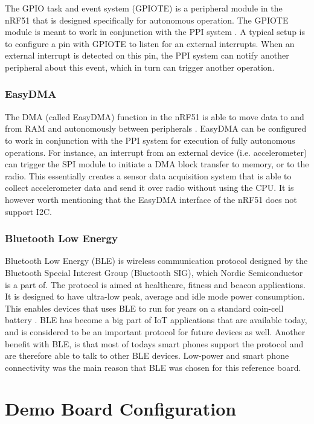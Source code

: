 The GPIO task and event system (GPIOTE) is a peripheral module in the nRF51 that is designed specifically for autonomous operation. The GPIOTE module is meant to work in conjunction with the PPI system \cite[~p.35]{nrf51}. A typical setup is to configure a pin with GPIOTE to listen for an external interrupts. When an external interrupt is detected on this pin, the PPI system can notify another peripheral about this event, which in turn can trigger another operation.

\subsubsection{EasyDMA}

The DMA (called EasyDMA) function in the nRF51 is able to move data to and from RAM and autonomously between peripherals \cite[~p.34]{nrf51}. EasyDMA can be configured to work in conjunction with the PPI system for execution of fully autonomous operations. For instance, an interrupt from an external device (i.e. accelerometer) can trigger the SPI module to initiate a DMA block transfer to memory, or to the radio. This essentially creates a sensor data acquisition system that is able to collect accelerometer data and send it over radio without using the CPU. It is however worth mentioning that the EasyDMA interface of the nRF51 does not support I2C.

\subsubsection{Bluetooth Low Energy}

Bluetooth Low Energy (BLE) is wireless communication protocol designed by the Bluetooth Special Interest Group (Bluetooth SIG), which Nordic Semiconductor is a part of. The protocol is aimed at healthcare, fitness and beacon applications. It is designed to have ultra-low peak, average and idle mode power consumption. This enables devices that uses BLE to run for years on a standard coin-cell battery \cite{ble}. BLE has become a big part of IoT applications that are available today, and is considered to be an important protocol for future devices as well. Another benefit with BLE, is that most of todays smart phones support the protocol and are therefore able to talk to other BLE devices. Low-power and smart phone connectivity was the main reason that BLE was chosen for this reference board. 

\section{Demo Board Configuration}

